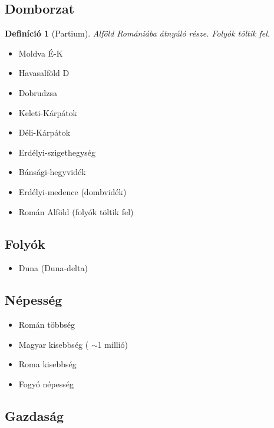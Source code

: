 \documentclass{article}
\newtheorem{definition}{Definíció}
\begin{document}
\subsection{Domborzat}
\begin{definition}[Partium]
        Alföld Romániába átnyúló része. Folyók töltik fel.
\end{definition}
\begin{itemize}
    \item Moldva É-K
    \item Havasalföld D
    \item Dobrudzsa 
\end{itemize}
\begin{itemize}
    \item Keleti-Kárpátok
    \item Déli-Kárpátok
    \item Erdélyi-szigethegység
    \item Bánsági-hegyvidék
\end{itemize}
\begin{itemize}
    \item Erdélyi-medence (dombvidék)
    \item Román Alföld (folyók töltik fel)
\end{itemize}

\subsection{Folyók}
\begin{itemize}
    \item Duna (Duna-delta)
\end{itemize}

\subsection{Népesség}
\begin{itemize}
    \item Román többség
    \item Magyar kisebbség ( $\sim$1 millió)
    \item Roma kisebbség
    \item Fogyó népesség
\end{itemize}

\subsection{Gazdaság}
\end{document}
